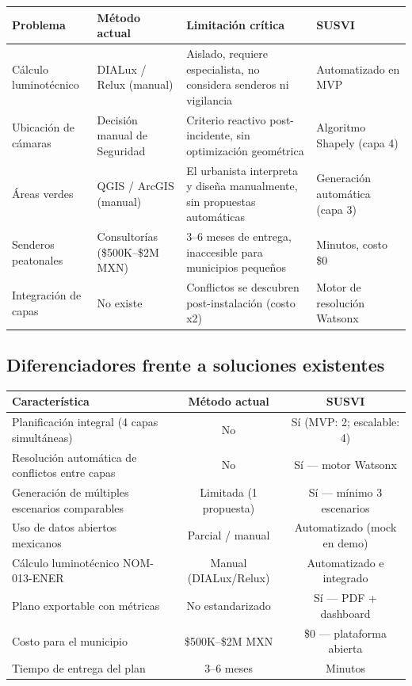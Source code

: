 \documentclass[12pt,a4paper]{article}
\begin{document}
\begin{table}[H]
\centering
\small
\renewcommand{\arraystretch}{1.3}
\begin{tabularx}{\textwidth}{l l X X}
\toprule
\rowcolor{azuloscuro}
\color{white}\textbf{Problema} & \color{white}\textbf{Método actual} & \color{white}\textbf{Limitación crítica} & \color{white}\textbf{SUSVI} \\
\midrule
Cálculo luminotécnico & DIALux / Relux (manual) & Aislado, requiere especialista, no considera senderos ni vigilancia & Automatizado en MVP \\
\rowcolor{fondoazul}
Ubicación de cámaras & Decisión manual de Seguridad & Criterio reactivo post-incidente, sin optimización geométrica & Algoritmo Shapely (capa 4) \\
Áreas verdes & QGIS / ArcGIS (manual) & El urbanista interpreta y diseña manualmente, sin propuestas automáticas & Generación automática (capa 3) \\
\rowcolor{fondoazul}
Senderos peatonales & Consultorías (\$500K–\$2M MXN) & 3–6 meses de entrega, inaccesible para municipios pequeños & Minutos, costo \$0 \\
Integración de capas & No existe & Conflictos se descubren post-instalación (costo x2) & Motor de resolución Watsonx \\
\bottomrule
\end{tabularx}
\end{table}

\subsection{Diferenciadores frente a soluciones existentes}

\begin{table}[H]
\centering
\small
\renewcommand{\arraystretch}{1.3}
\begin{tabularx}{\textwidth}{X c c}
\toprule
\rowcolor{azuloscuro}
\color{white}\textbf{Característica} & \color{white}\textbf{Método actual} & \color{white}\textbf{SUSVI} \\
\midrule
Planificación integral (4 capas simultáneas) & No & Sí (MVP: 2; escalable: 4) \\
\rowcolor{fondoazul}
Resolución automática de conflictos entre capas & No & Sí — motor Watsonx \\
Generación de múltiples escenarios comparables & Limitada (1 propuesta) & Sí — mínimo 3 escenarios \\
\rowcolor{fondoazul}
Uso de datos abiertos mexicanos & Parcial / manual & Automatizado (mock en demo) \\
Cálculo luminotécnico NOM-013-ENER & Manual (DIALux/Relux) & Automatizado e integrado \\
\rowcolor{fondoazul}
Plano exportable con métricas & No estandarizado & Sí — PDF + dashboard \\
Costo para el municipio & \$500K–\$2M MXN & \$0 — plataforma abierta \\
\rowcolor{fondoazul}
Tiempo de entrega del plan & 3–6 meses & Minutos \\
\bottomrule
\end{tabularx}
\end{table}
\end{document}

